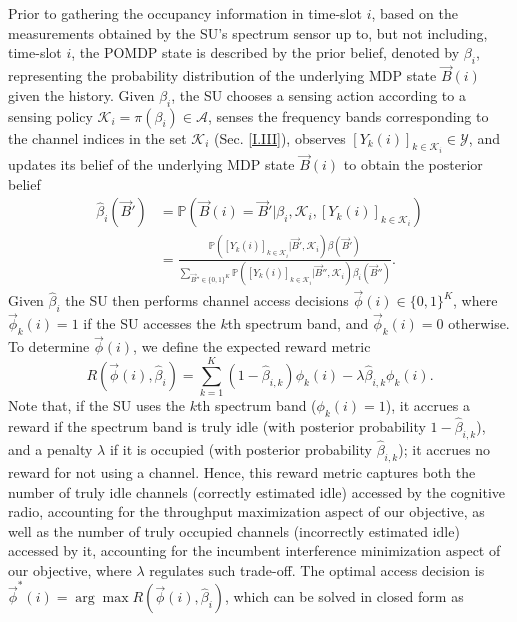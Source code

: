 \documentclass[12pt, draftcls, onecolumn]{IEEEtran}
\begin{document}
Prior to gathering the occupancy information in time-slot $i$, based on the measurements obtained by the SU's spectrum sensor up to, but not including, time-slot $i$, the POMDP state is described by the prior belief, denoted by $\beta_{i}$, representing the probability distribution of the underlying MDP state $\vec{B}(i)$ given the history. Given $\beta_{i}$, the SU chooses a sensing action according to a sensing policy $\mathcal{K}_{i}=\pi(\beta_{i}){\in}\mathcal{A}$, 
senses the frequency bands corresponding to the channel indices in the set $\mathcal{K}_{i}$ (Sec. \ref{I.III}), observes $[Y_{k}(i)]_{k{\in}\mathcal{K}_{i}}{\in}\mathcal{Y}$, and updates its belief of the underlying MDP state $\vec{B}(i)$ to obtain the posterior belief
\begin{equation}\label{10}
    \begin{aligned}
        \hat{\beta}_{i}(\vec{B}')&=\mathbb{P}(\vec{B}(i)=\vec{B}'|\beta_{i},\mathcal{K}_{i},[Y_{k}(i)]_{k{\in}\mathcal{K}_{i}})\\
        &=\frac{\mathbb{P}([Y_{k}(i)]_{k{\in}\mathcal{K}_{i}}|\vec{B}',\mathcal{K}_{i})\beta(\vec{B}')}{\sum_{\vec{B}'' \in \{0,1\}^{K}}\mathbb{P}([Y_{k}(i)]_{k{\in}\mathcal{K}_{i}}|\vec{B}'',\mathcal{K}_{i})\beta_{i}(\vec{B}'')}.
    \end{aligned}
\end{equation}
Given  $ \hat{\beta}_{i}$ the SU then performs channel access decisions
$\vec{\phi}(i)\in\{0,1\}^K$, where
$\vec{\phi}_k(i)=1$ if the SU accesses the $k$th spectrum band, and $\vec{\phi}_k(i)=0$ otherwise. To determine $\vec{\phi}(i)$, we define the expected reward metric
\begin{equation}\label{12}
    R(\vec{\phi}(i),\hat{\beta}_{i})=\sum_{k=1}^{K}(1-\hat{\beta}_{i,k})\phi_{k}(i)-\lambda \hat{\beta}_{i,k}\phi_k(i).
\end{equation}
Note that, if the SU uses the $k$th spectrum band ($\phi_{k}(i)=1$), it accrues a reward if the
spectrum band is truly idle (with posterior probability $1-\hat{\beta}_{i,k}$), and a penalty $\lambda$ if it is occupied (with posterior probability $\hat{\beta}_{i,k}$); it accrues no reward for not using a channel. Hence, this reward metric captures both the number of truly idle channels (correctly estimated idle) accessed by the cognitive radio, accounting for the throughput maximization aspect of our objective, as well as the number of truly occupied channels (incorrectly estimated idle) accessed by it, accounting for the incumbent interference minimization aspect of our objective, where $\lambda$ regulates such trade-off. The optimal access decision is $\vec{\phi}^{*}(i){=}\arg\max R(\vec{\phi}(i),\hat{\beta}_{i})$, which can be solved in closed form as
\end{document}

